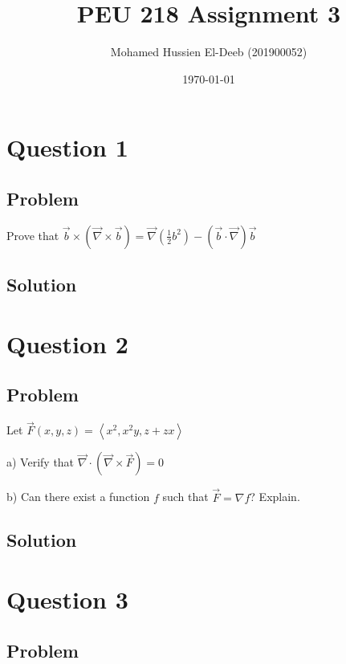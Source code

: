 \documentclass[12pt]{article}
\title{PEU 218 Assignment 3}
\author{Mohamed Hussien El-Deeb (201900052)}
\date{\today}
\begin{document}
\maketitle
\tableofcontents
\hypersetup{linkcolor=RoyalBlue4}

\newpage
\section{Question 1}

\subsection{Problem}

Prove that \(\vec{b} \times(\vec{\nabla} \times \vec{b})=\vec{\nabla}\left(\frac{1}{2} b^2\right)-(\vec{b} \cdot \vec{\nabla}) \vec{b}\)

\subsection{Solution}



\newpage
\section{Question 2}

\subsection{Problem}

Let \(\vec{F}(x, y, z)=\left\langle x^2, x^2 y, z+z x\right\rangle \)

a) Verify that \(\vec{\nabla} \cdot(\vec{\nabla} \times \vec{F})=0\)

b) Can there exist a function \(f\) such that \(\vec{F}=\nabla f\)? Explain.

\subsection{Solution}



\newpage
\section{Question 3}

\subsection{Problem}
\end{document}
